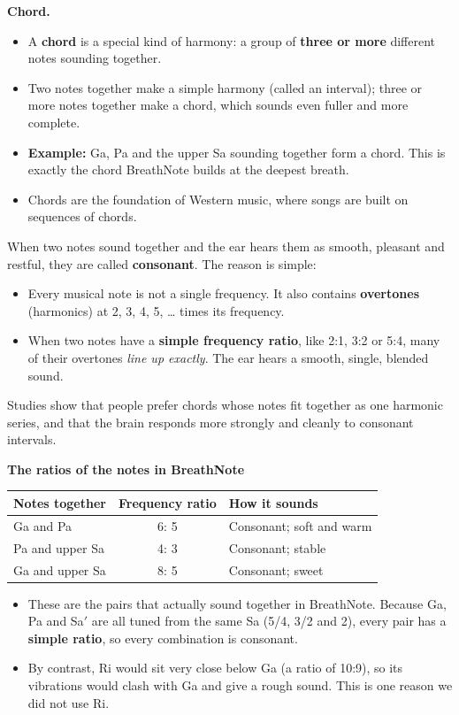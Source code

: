\documentclass[12pt,a4paper]{article}
\newcommand{\Sah}{Sa\ensuremath{'}}     %
\begin{document}
\textbf{Chord.}
\begin{itemize}
  \item A \textbf{chord} is a special kind of harmony: a group of \textbf{three or more} different notes sounding together.
  \item Two notes together make a simple harmony (called an interval); three or more notes together make a chord, which sounds even fuller and more complete.
  \item \textbf{Example:} Ga, Pa and the upper Sa sounding together form a chord. This is exactly the chord BreathNote builds at the deepest breath.
  \item Chords are the foundation of Western music, where songs are built on sequences of chords.
\end{itemize}

When two notes sound together and the ear hears them as smooth, pleasant and restful, they are called \textbf{consonant}. The reason is simple:
\begin{itemize}
  \item Every musical note is not a single frequency. It also contains \textbf{overtones} (harmonics) at 2, 3, 4, 5, \ldots{} times its frequency.
  \item When two notes have a \textbf{simple frequency ratio}, like 2:1, 3:2 or 5:4, many of their overtones \emph{line up exactly}. The ear hears a smooth, single, blended sound.
\end{itemize}
Studies show that people prefer chords whose notes fit together as one harmonic series, and that the brain responds more strongly and cleanly to consonant intervals.

\textbf{The ratios of the notes in BreathNote}
\begin{table}[H]
\centering
\small
\begin{tabular}{@{}l c l@{}}
\toprule
\textbf{Notes together} & \textbf{Frequency ratio} & \textbf{How it sounds} \\
\midrule
Ga and Pa                  & 6: 5 & Consonant; soft and warm \\
Pa and upper Sa            & 4: 3 & Consonant; stable \\
Ga and upper Sa            & 8: 5 & Consonant; sweet \\
\bottomrule
\end{tabular}
\end{table}
\begin{itemize}
  \item These are the pairs that actually sound together in BreathNote. Because Ga, Pa and \Sah{} are all tuned from the same Sa (5/4, 3/2 and 2), every pair has a \textbf{simple ratio}, so every combination is consonant.
  \item By contrast, Ri would sit very close below Ga (a ratio of 10:9), so its vibrations would clash with Ga and give a rough sound. This is one reason we did not use Ri.
\end{itemize}
\end{document}
